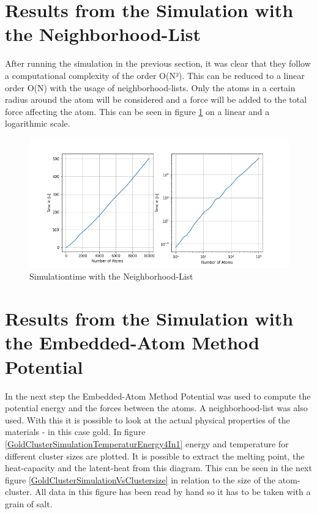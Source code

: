 \section{Results from the Simulation with the Neighborhood-List}

After running the simulation in the previous section, it was clear that they follow a computational complexity of the order O(N²). This can be reduced to a linear order O(N) with the usage of neighborhood-lists. Only the atoms in a certain radius around the atom will be considered and a force will be added to the total force affecting the atom. This can be seen in figure \ref{PlotSimulationTimesCutoffNew} on a linear and a logarithmic scale.  
\begin{figure}
	\begin{center}
		\includegraphics[scale=1.25]{Figure/plotAtomTimesMoreData.png}
	\end{center}
	\caption[Simulationtime with the Neighborhood-List]{Simulationtime with the Neighborhood-List}
	\label{PlotSimulationTimesCutoffNew}
\end{figure}

\section{Results from the Simulation with the Embedded-Atom Method Potential}

In the next step the Embedded-Atom Method Potential was used to compute the potential energy and the forces between the atoms. A neighborhood-list was also used. With this it is possible to look at the actual physical properties of the materials - in this case gold. In figure \ref{GoldClusterSimulationTemperaturEnergy4In1} energy and temperature for different cluster sizes are plotted. It is possible to extract the melting point, the heat-capacity and the latent-heat from this diagram. This can be seen in the next figure \ref{GoldClusterSimulationVsClustersize} in relation to the size of the atom-cluster. All data in this figure has been read by hand so it has to be taken with a grain of salt. 

